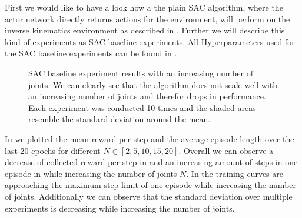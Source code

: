 First we would like to have a look how a the plain SAC algorithm, where the actor network directly returns actions for the environment, will perform on the inverse kinematics environment as described in . Further we will describe this kind of experiments as SAC baseline experiments. All Hyperparameters used for the SAC baseline experiments can be found in .
\begin{figure}
    \begin{center}
        \hfill
    \end{center}
    \caption[SAC baseline experiment results]{SAC baseline experiment results with an increasing number of joints. We can clearly see that the algorithm does not scale well with an increasing number of joints and therefor drops in performance. Each experiment was conducted 10 times and the shaded areas resemble the standard deviation around the mean.}
    \label{fig:SAC_baseline}
\end{figure}

In  we plotted the mean reward per step and the average episode length over the last 20 epochs for different $N \in [2, 5, 10, 15, 20]$. Overall we can observe a decrease of collected reward per step in  and an increasing amount of steps in one episode in  while increasing the number of joints $N$. In  the training curves are approaching the maximum step limit of one episode while increasing the number of joints. Additionally we can observe that the standard deviation over multiple experiments is decreasing while increasing the number of joints.

